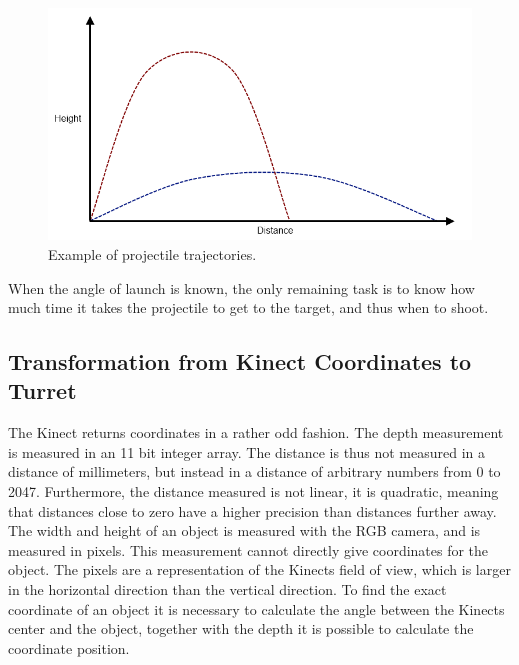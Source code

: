 \begin{figure}[hbtp]
\includegraphics[width=\textwidth]{img/projectile-trajectory-graph.png}
\caption{Example of projectile trajectories.} 
\label{fig:projectile-trajectory} 
\end{figure}

When the angle of launch is known, the only remaining task is to know how much time it takes the projectile to get to the target, and thus when to shoot.

\subsection{Transformation from Kinect Coordinates to Turret}
The Kinect returns coordinates in a rather odd fashion. The depth measurement is measured in an 11 bit integer array\cite{kinectdistance}. The distance is thus not measured in a distance of millimeters, but instead in a distance of arbitrary numbers from 0 to 2047. Furthermore, the distance measured is not linear, it is quadratic, meaning that distances close to zero have a higher precision than distances further away.
The width and height of an object is measured with the RGB camera, and is measured in pixels. This measurement cannot directly give coordinates for the object. The pixels are a representation of the Kinects field of  view, which is larger in the horizontal direction than the vertical direction. To find the exact coordinate of an object it is necessary to calculate the angle between the Kinects center and the object, together with the depth it is possible to calculate the coordinate position.